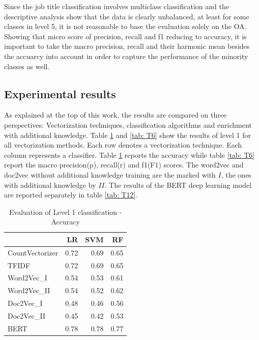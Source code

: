 \documentclass[12pt, a4paper, titlepage]{article}
\begin{document}
Since the job title classification involves multiclass classification and the descriptive analysis show that the data is clearly unbalanced, at least for some classes in level 5, it is not reasonable to base the evaluation solely on the \ac{OA}. Showing that micro score of precision, recall and f1 reducing to accuracy, it is important to take the macro precision, recall and their harmonic mean besides the accuarcy into account in order to capture the performance of the minority classes as well. 


\subsection{Experimental results}

As explained at the top of this work, the results are compared on three perspectives: Vectorization techniques, classification algorithms and enrichment with additional knowledge. Table \ref{tab: T5} and \ref{tab: T6} show the results of level 1 for all vectorization methods. Each row denotes a vectorization technique. Each column represents a classifier. Table \ref{tab: T5} reports the accuracy while table \ref{tab: T6}  report the macro precision(p), recall(r) and f1(F1) scores. The word2vec and doc2vec without additional knowledge training are the marked with $I$, the ones with additional knowledge by $II$. The results of the \ac{BERT} deep learning model are reported separately in table \ref{tab: T12}. 


\begin{table}[hb!]
  \center
\begin{tabular}{lrrr} 
  \hline
  {} &    \textbf{LR} &   \textbf{SVM} &    \textbf{RF} \\
  \hline
CountVectorizer &  0.72 &  0.69 &  0.65 \\
TFIDF           &  0.72 &  0.69 &  0.65 \\
Word2Vec\_I      &  0.54 &  0.53 &  0.61 \\
Word2Vec\_II     &  0.54 &  0.52 &  0.62 \\
Doc2Vec\_I       &  0.48 &  0.46 &  0.56 \\
Doc2Vec\_II      &  0.45 &  0.42 &  0.53 \\
BERT            &  0.78 &  0.78 &  0.77 \\
  \hline
  \end{tabular}
  \caption{\label{tab: T5} Evaluation of Level 1 classification - Accuracy}
\end{table}
\end{document}

